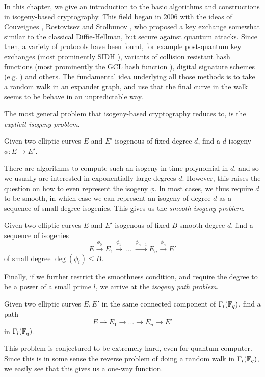 In this chapter, we give an introduction to the basic algorithms and constructions in isogeny-based cryptography.
This field began in 2006 with the ideas of Couveignes \cite{old_isogeny_crypto1}, Rostovtsev and Stolbunov \cite{old_isogeny_crypto2, old_isogeny_crypto3}, who proposed a key exchange somewhat similar to the classical Diffie-Hellman, but secure against quantum attacks.
Since then, a variety of protocols have been found, for example post-quantum key exchanges (most prominently SIDH \cite{sidh}), variants of collision resistant hash functions (most prominently the GCL hash function \cite{supersingular_hash_function}), digital signature schemes (e.g. \cite{digital_signature}) and others. 
The fundamental idea underlying all those methods is to take a random walk in an expander graph, and use that the final curve in the walk seems to be behave in an unpredictable way.

The most general problem that isogeny-based cryptography reduces to, is the \emph{explicit isogeny problem}.
\begin{problem}
    Given two elliptic curves $E$ and $E'$ isogenous of fixed degree $d$, find a $d$-isogeny $\phi: E \to E'$.
\end{problem}
There are algorithms to compute such an isogeny in time polynomial in $d$, and so we usually are interested in exponentially large degrees $d$.
However, this raises the question on how to even represent the isogeny $\phi$.
In most cases, we thus require $d$ to be smooth, in which case we can represent an isogeny of degree $d$ as a sequence of small-degree isogenies.
This gives us the \emph{smooth isogeny problem}.
\begin{problem}
    Given two elliptic curves $E$ and $E'$ isogenous of fixed $B$-smooth degree $d$, find a sequence of isogenies
    \begin{equation*}
        E \overset{\phi_0}{\longrightarrow} E_1 \overset{\phi_1}{\longrightarrow} \ ... \ \overset{\phi_{n - 1}}{\longrightarrow} E_n \overset{\phi_n}{\longrightarrow} E'
    \end{equation*}
    of small degree $\deg(\phi_i) \leq B$.
\end{problem}
Finally, if we further restrict the smoothness condition, and require the degree to be a power of a small prime $l$, we arrive at the \emph{isogeny path problem}.
\begin{problem}
    Given two elliptic curves $E, E'$ in the same connected component of $\Gamma_l(\mathbb{F}_q)$, find a path
    \begin{equation*}
        E \to E_1 \to ... \to E_n \to E'
    \end{equation*}
    in $\Gamma_l(\mathbb{F}_q)$.
\end{problem}
This problem is conjectured to be extremely hard, even for quantum computer.
Since this is in some sense the reverse problem of doing a random walk in $\Gamma_l(\mathbb{F}_q)$, we easily see that this gives us a one-way function.


